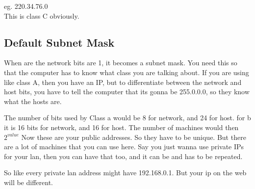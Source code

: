 \documentclass[11pt]{article}
\begin{document}
eg. 220.34.76.0\\ 
This is class C obviously. 

\subsection*{Default Subnet Mask}
When are the network bits are 1, it becomes a subnet mask. 
You need this so that the computer has to know what class you are talking about. If you are using like class A, then you have an IP, but to differentiate between the network and host bits, you have to tell the computer that its gonna be 255.0.0.0, so they know what the hosts are. 

The number of bits used by Class a would be 8 for network, and 24 for host. 
for b it is 16 bits for network, and 16 for host. The number of machines would then $2^{value}$
Now these are your public addresses. So they have to be unique. But there are a lot of machines that you can use here. Say you just wanna use private IPs for your lan, then you can have that too, and it can be and has to be repeated. 

So like every private lan address might have 192.168.0.1. But your ip on the web will be different. 
\end{document}
